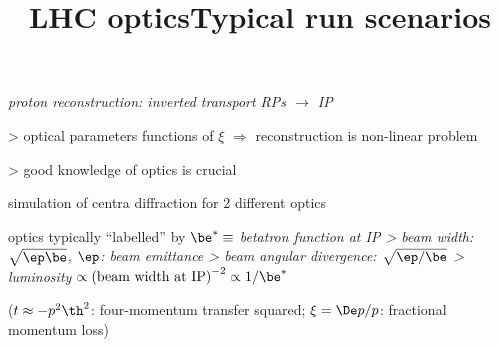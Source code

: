 \vfil

\> \em{proton reconstruction}: inverted transport RPs $\longrightarrow$ IP

\>> optical parameters functions of $\xi$ $\Rightarrow$ reconstruction is non-linear problem

\>> \cRed good knowledge of optics is crucial

\newpage %
\title{LHC optics}

\> simulation of centra diffraction for 2 different optics

\vskip2mm

\vfil
\> optics typically ``labelled'' by \em{$\be^* \equiv$ betatron function at IP}
\>> beam width: $\sqrt{\ep \be}$, $\ep$: beam emittance
\>> beam angular divergence: $\sqrt{\ep / \be}$
\>> luminosity $\propto \hbox{(beam width at IP)}^{-2} \propto 1/\be^*$


\newpage %
\title{Typical run scenarios}

\centerline{\SmallerFonts ($t \approx -p^2 \th^2$: four-momentum transfer squared; $\xi = \De p / p$: fractional momentum loss)}
\vskip1mm

